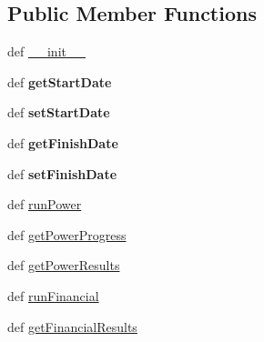 \subsection*{Public Member Functions}
\begin{DoxyCompactItemize}
\item 
def \hyperlink{class_solar_calculator_1_1_simulation_1_1_simulation_a7074efc6af524b85788035ee87320f08}{\-\_\-\-\_\-init\-\_\-\-\_\-}
\item 
\hypertarget{class_solar_calculator_1_1_simulation_1_1_simulation_a8d6cb76653f32604439eb8dad919b590}{def {\bfseries get\-Start\-Date}}\label{class_solar_calculator_1_1_simulation_1_1_simulation_a8d6cb76653f32604439eb8dad919b590}

\item 
\hypertarget{class_solar_calculator_1_1_simulation_1_1_simulation_a9f376292f2ed7458c5eed28a6624accc}{def {\bfseries set\-Start\-Date}}\label{class_solar_calculator_1_1_simulation_1_1_simulation_a9f376292f2ed7458c5eed28a6624accc}

\item 
\hypertarget{class_solar_calculator_1_1_simulation_1_1_simulation_aec7cc487a59d102163d000688b2e3e77}{def {\bfseries get\-Finish\-Date}}\label{class_solar_calculator_1_1_simulation_1_1_simulation_aec7cc487a59d102163d000688b2e3e77}

\item 
\hypertarget{class_solar_calculator_1_1_simulation_1_1_simulation_a13aadd40f98533deaf94661b100f6873}{def {\bfseries set\-Finish\-Date}}\label{class_solar_calculator_1_1_simulation_1_1_simulation_a13aadd40f98533deaf94661b100f6873}

\item 
def \hyperlink{class_solar_calculator_1_1_simulation_1_1_simulation_aad02cdd5619f07f09fda6fc2b54066c3}{run\-Power}
\item 
def \hyperlink{class_solar_calculator_1_1_simulation_1_1_simulation_a191e776c4603c194583987ea097ca1e9}{get\-Power\-Progress}
\item 
def \hyperlink{class_solar_calculator_1_1_simulation_1_1_simulation_a694bd56137d515dda72d353819a7ed84}{get\-Power\-Results}
\item 
def \hyperlink{class_solar_calculator_1_1_simulation_1_1_simulation_a9f3b4cda08ebca2d3886a5e6e83fd824}{run\-Financial}
\item 
def \hyperlink{class_solar_calculator_1_1_simulation_1_1_simulation_a66e4664bc749086d4e7fe560c2e30444}{get\-Financial\-Results}
\end{DoxyCompactItemize}
